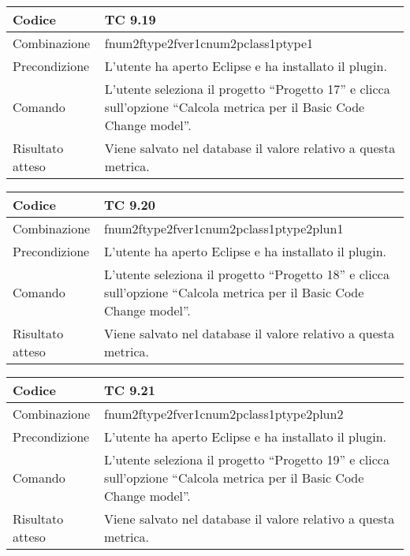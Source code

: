 \clearpage

\begin{table}[ht]
\begin{tabular}{|p{3cm}|p{9cm}|}
\hline
\cellcolor{lightgray}Codice				& TC 9.19								\\
\hline
\cellcolor{lightgray}Combinazione		& fnum2ftype2fver1cnum2pclass1ptype1									\\
\hline
\cellcolor{lightgray}Precondizione		& L'utente ha aperto Eclipse e ha installato il plugin.		\\
\hline
\cellcolor{lightgray}Comando			& L'utente seleziona il progetto ``Progetto 17''  e clicca sull'opzione ``Calcola metrica per il Basic Code Change model''.	\\
\hline
\cellcolor{lightgray}Risultato atteso	& Viene salvato nel database il valore relativo a questa metrica.\\
\hline
\end{tabular}
\end{table}

\begin{table}[ht]
\begin{tabular}{|p{3cm}|p{9cm}|}
\hline
\cellcolor{lightgray}Codice				& TC 9.20								\\
\hline
\cellcolor{lightgray}Combinazione		& fnum2ftype2fver1cnum2pclass1ptype2plun1									\\
\hline
\cellcolor{lightgray}Precondizione		& L'utente ha aperto Eclipse e ha installato il plugin.		\\
\hline
\cellcolor{lightgray}Comando			& L'utente seleziona il progetto ``Progetto 18''  e clicca sull'opzione ``Calcola metrica per il Basic Code Change model''.	\\
\hline
\cellcolor{lightgray}Risultato atteso	& Viene salvato nel database il valore relativo a questa metrica.\\
\hline
\end{tabular}
\end{table}

\begin{table}[ht]
\begin{tabular}{|p{3cm}|p{9cm}|}
\hline
\cellcolor{lightgray}Codice				& TC 9.21								\\
\hline
\cellcolor{lightgray}Combinazione		& fnum2ftype2fver1cnum2pclass1ptype2plun2									\\
\hline
\cellcolor{lightgray}Precondizione		& L'utente ha aperto Eclipse e ha installato il plugin.		\\
\hline
\cellcolor{lightgray}Comando			& L'utente seleziona il progetto ``Progetto 19''  e clicca sull'opzione ``Calcola metrica per il Basic Code Change model''.	\\
\hline
\cellcolor{lightgray}Risultato atteso	& Viene salvato nel database il valore relativo a questa metrica.\\
\hline
\end{tabular}
\end{table}

